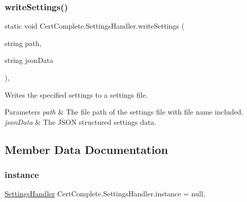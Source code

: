 \subsubsection{\texorpdfstring{write\+Settings()}{writeSettings()}}
{\footnotesize\ttfamily static void Cert\+Complete.\+Settings\+Handler.\+write\+Settings (\begin{DoxyParamCaption}\item[{string}]{path,  }\item[{string}]{json\+Data }\end{DoxyParamCaption})\hspace{0.3cm}{\ttfamily [inline]}, {\ttfamily [static]}}



Writes the specified settings to a settings file. 


\begin{DoxyParams}{Parameters}
{\em path} & The file path of the settings file with file name included.\\
\hline
{\em json\+Data} & The J\+S\+ON structured settings data.\\
\hline
\end{DoxyParams}


\subsection{Member Data Documentation}
\mbox{\label{class_cert_complete_1_1_settings_handler_a4aeaa8c6596fb57a409c1e54fc3fad45}} 
\subsubsection{\texorpdfstring{instance}{instance}}
{\footnotesize\ttfamily \mbox{\hyperlink{class_cert_complete_1_1_settings_handler}{Settings\+Handler}} Cert\+Complete.\+Settings\+Handler.\+instance = null\hspace{0.3cm}{\ttfamily [static]}, {\ttfamily [private]}}

\mbox{\label{class_cert_complete_1_1_settings_handler_aee0063e49037dee79caca19d8b22630a}} 
